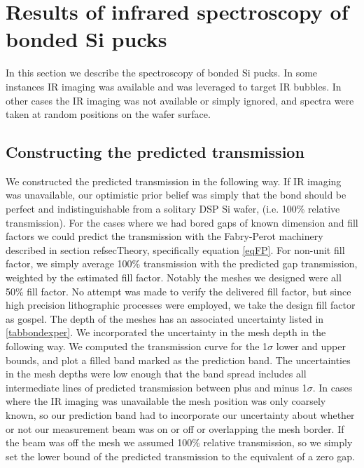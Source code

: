 \documentclass[osajnl,preprint,showpacs,superscriptaddress,12pt]{revtex4-1} %
\begin{document}
\section{Results of infrared spectroscopy of bonded Si pucks}
\label{secResults}
In this section we describe the spectroscopy of bonded Si pucks.  In some instances IR imaging was available and was leveraged to target IR bubbles.  In other cases the IR imaging was not available or simply ignored, and spectra were taken at random positions on the wafer surface.  

\subsection{Constructing the predicted transmission}
We constructed the predicted transmission in the following way.  If IR imaging was unavailable, our optimistic prior belief was simply that the bond should be perfect and indistinguishable from a solitary DSP Si wafer, (i.e. 100\% relative transmission).  For the cases where we had bored gaps of known dimension and fill factors we could predict the transmission with the Fabry-Perot machinery described in section ref{secTheory}, specifically equation \ref{eqFP}.  For non-unit fill factor, we simply average 100\% transmission with the predicted gap transmission, weighted by the estimated fill factor.  Notably the meshes we designed were all 50\% fill factor.  No attempt was made to verify the delivered fill factor, but since high precision lithographic processes were employed, we take the design fill factor as gospel.  The depth of the meshes has an associated uncertainty listed in \ref{tabbondexper}.  We incorporated the uncertainty in the mesh depth in the following way.  We computed the transmission curve for the 1$\sigma$ lower and upper bounds, and plot a filled band marked as the prediction band.  The uncertainties in the mesh depths were low enough that the band spread includes all intermediate lines of predicted transmission between plus and minus 1$\sigma$.  In cases where the IR imaging was unavailable the mesh position was only coarsely known, so our prediction band had to incorporate our uncertainty about whether or not our measurement beam was on or off or overlapping the mesh border.  If the beam was off the mesh we assumed 100\% relative transmission, so we simply set the lower bound of the predicted transmission to the equivalent of a zero gap.  
\end{document}
